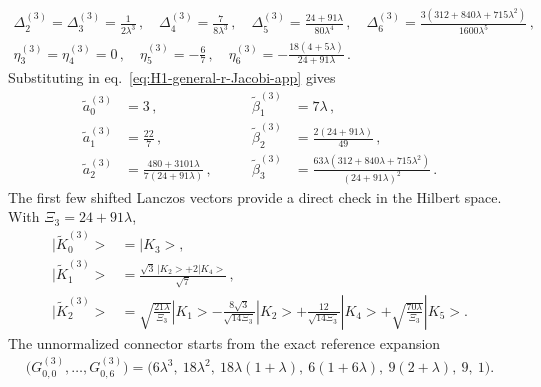 \documentclass[a4paper,11pt]{article}
\def\ket#1{|#1>}%
\theoremstyle{definition}
\theoremstyle{remark}
\newcommand{\ket}[1]{|#1\rangle}
\begin{document}
\begin{gather}
   \Delta_2^{(3)}=\Delta_3^{(3)}=\frac{1}{2\lambda^3}\,,
   \quad
   \Delta_4^{(3)}=\frac{7}{8\lambda^3}\,,
   \quad
   \Delta_5^{(3)}=\frac{24+91\lambda}{80\lambda^4}\,, \quad
   \Delta_6^{(3)}
   =\frac{3(312+840\lambda+715\lambda^2)}{1600\lambda^5}\,, \nonumber \\
   \eta_3^{(3)}=\eta_4^{(3)}=0\,, \quad
   \eta_5^{(3)}=-\frac67\,,\quad
   \eta_6^{(3)}=-\frac{18(4+5\lambda)}{24+91\lambda}\,. \label{eq:H1-r3-Delta-eta-app}
\end{gather}
Substituting in eq.~\eqref{eq:H1-general-r-Jacobi-app} gives
\begin{equation}
\begin{alignedat}{2}
   \widetilde a_0^{(3)}
   &=3\,,
   &\qquad
   \widetilde\beta_1^{(3)}
   &=7\lambda\,,\\
   \widetilde a_1^{(3)}
   &=\frac{22}{7}\,,
   &\qquad
   \widetilde\beta_2^{(3)}
   &=\frac{2(24+91\lambda)}{49}\,,\\
   \widetilde a_2^{(3)}
   &=\frac{480+3101\lambda}
   {7(24+91\lambda)}\,,
   &\qquad
   \widetilde\beta_3^{(3)}
   &=\frac{63\lambda(312+840\lambda+715\lambda^2)}
   {(24+91\lambda)^2}\,.
\end{alignedat}
\label{eq:H1-r3-Jacobi-app}
\end{equation}
The first few shifted Lanczos vectors provide a direct check in the Hilbert space. With $\Xi_3=24+91\lambda$,
\begin{equation}
\begin{aligned}
   \ket{\widetilde K_0^{(3)}}&=\ket{K_3},\\
   \ket{\widetilde K_1^{(3)}}&=
   \frac{\sqrt3\,\ket{K_2}+2\ket{K_4}}{\sqrt7}\,,\\
   \ket{\widetilde K_2^{(3)}}&=
   \sqrt{\frac{21\lambda}{\Xi_3}}\ket{K_1}
   -\frac{8\sqrt3}{\sqrt{14\Xi_3}}\ket{K_2}
   +\frac{12}{\sqrt{14\Xi_3}}\ket{K_4}
   +\sqrt{\frac{70\lambda}{\Xi_3}}\ket{K_5}.
\end{aligned}
   \label{eq:H1-r3-Krylov-vectors-app}
\end{equation}
The unnormalized connector starts from the exact reference expansion 
\begin{equation}
\begin{aligned}
   \bigl(G_{0,0}^{(3)},\ldots,G_{0,6}^{(3)}\bigr)=\bigl(
   6\lambda^3,\ 18\lambda^2,\ 18\lambda(1+\lambda),\ 6(1+6\lambda),\ 9(2+\lambda),\ 9,\ 1\bigr).
\end{aligned}
   \label{eq:H1-r3-initial-connector-app}
\end{equation}
\end{document}
